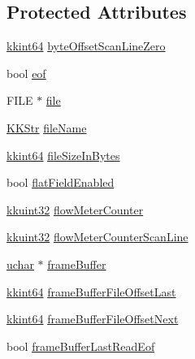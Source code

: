 \subsection*{Protected Attributes}
\begin{DoxyCompactItemize}
\item 
\hyperlink{namespace_k_k_b_aa3486b1c5ea9162b3b020c69f72826eb}{kkint64} \hyperlink{class_k_k_l_s_c_1_1_scanner_file_a648a1ee97c52ec2391e6ab5d63515b98}{byte\+Offset\+Scan\+Line\+Zero}
\item 
bool \hyperlink{class_k_k_l_s_c_1_1_scanner_file_aab1ab73f86c83384609406accceac88f}{eof}
\item 
F\+I\+LE $\ast$ \hyperlink{class_k_k_l_s_c_1_1_scanner_file_a26db15f7823ce67b1621da17468ec807}{file}
\item 
\hyperlink{class_k_k_b_1_1_k_k_str}{K\+K\+Str} \hyperlink{class_k_k_l_s_c_1_1_scanner_file_a1078c1360a71957a3cec77bb675fc144}{file\+Name}
\item 
\hyperlink{namespace_k_k_b_aa3486b1c5ea9162b3b020c69f72826eb}{kkint64} \hyperlink{class_k_k_l_s_c_1_1_scanner_file_aa630f7e950cfd1cd6ecaa901f410728a}{file\+Size\+In\+Bytes}
\item 
bool \hyperlink{class_k_k_l_s_c_1_1_scanner_file_ade90241dba08bbf4901084e6187f9289}{flat\+Field\+Enabled}
\item 
\hyperlink{namespace_k_k_b_af8d832f05c54994a1cce25bd5743e19a}{kkuint32} \hyperlink{class_k_k_l_s_c_1_1_scanner_file_a4713a0fd6dabc99dec0fbeca2868b156}{flow\+Meter\+Counter}
\item 
\hyperlink{namespace_k_k_b_af8d832f05c54994a1cce25bd5743e19a}{kkuint32} \hyperlink{class_k_k_l_s_c_1_1_scanner_file_a1e194b239e06b9ba36b75725a2c2e37c}{flow\+Meter\+Counter\+Scan\+Line}
\item 
\hyperlink{namespace_k_k_b_ace9969169bf514f9ee6185186949cdf7}{uchar} $\ast$ \hyperlink{class_k_k_l_s_c_1_1_scanner_file_ab07c8ac594c6c8324e3078c8d4085633}{frame\+Buffer}
\item 
\hyperlink{namespace_k_k_b_aa3486b1c5ea9162b3b020c69f72826eb}{kkint64} \hyperlink{class_k_k_l_s_c_1_1_scanner_file_a90c4adfddeadda2794d0b643e5311a2b}{frame\+Buffer\+File\+Offset\+Last}
\item 
\hyperlink{namespace_k_k_b_aa3486b1c5ea9162b3b020c69f72826eb}{kkint64} \hyperlink{class_k_k_l_s_c_1_1_scanner_file_a76318219aaf8142be8a0dfb1705c7430}{frame\+Buffer\+File\+Offset\+Next}
\item 
bool \hyperlink{class_k_k_l_s_c_1_1_scanner_file_acef5b35ec5c8e02cf3d6f273b9e14a68}{frame\+Buffer\+Last\+Read\+Eof}

\end{DoxyCompactItemize}
